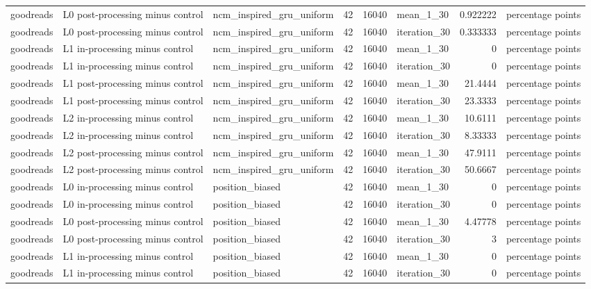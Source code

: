 \begin{table}[htbp!]
\begin{tabular}{lllrrlrl}
goodreads & L0 post-processing minus control & ncm\_inspired\_gru\_uniform & 42 & 16040 & mean\_1\_30 & 0.922222 & percentage points \\
goodreads & L0 post-processing minus control & ncm\_inspired\_gru\_uniform & 42 & 16040 & iteration\_30 & 0.333333 & percentage points \\
goodreads & L1 in-processing minus control & ncm\_inspired\_gru\_uniform & 42 & 16040 & mean\_1\_30 & 0 & percentage points \\
goodreads & L1 in-processing minus control & ncm\_inspired\_gru\_uniform & 42 & 16040 & iteration\_30 & 0 & percentage points \\
goodreads & L1 post-processing minus control & ncm\_inspired\_gru\_uniform & 42 & 16040 & mean\_1\_30 & 21.4444 & percentage points \\
goodreads & L1 post-processing minus control & ncm\_inspired\_gru\_uniform & 42 & 16040 & iteration\_30 & 23.3333 & percentage points \\
goodreads & L2 in-processing minus control & ncm\_inspired\_gru\_uniform & 42 & 16040 & mean\_1\_30 & 10.6111 & percentage points \\
goodreads & L2 in-processing minus control & ncm\_inspired\_gru\_uniform & 42 & 16040 & iteration\_30 & 8.33333 & percentage points \\
goodreads & L2 post-processing minus control & ncm\_inspired\_gru\_uniform & 42 & 16040 & mean\_1\_30 & 47.9111 & percentage points \\
goodreads & L2 post-processing minus control & ncm\_inspired\_gru\_uniform & 42 & 16040 & iteration\_30 & 50.6667 & percentage points \\
goodreads & L0 in-processing minus control & position\_biased & 42 & 16040 & mean\_1\_30 & 0 & percentage points \\
goodreads & L0 in-processing minus control & position\_biased & 42 & 16040 & iteration\_30 & 0 & percentage points \\
goodreads & L0 post-processing minus control & position\_biased & 42 & 16040 & mean\_1\_30 & 4.47778 & percentage points \\
goodreads & L0 post-processing minus control & position\_biased & 42 & 16040 & iteration\_30 & 3 & percentage points \\
goodreads & L1 in-processing minus control & position\_biased & 42 & 16040 & mean\_1\_30 & 0 & percentage points \\
goodreads & L1 in-processing minus control & position\_biased & 42 & 16040 & iteration\_30 & 0 & percentage points \\

\end{tabular}
\end{table}
